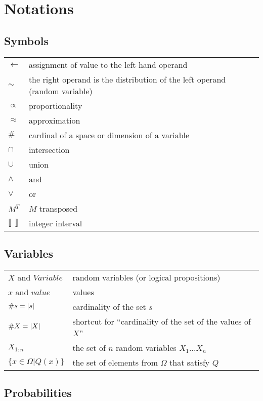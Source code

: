 \section*{Notations}

\subsection*{Symbols}
\begin{tabular}{ll}
$\leftarrow$ & assignment of value to the left hand operand \\
$\sim$ & the right operand is the distribution of the left operand (random variable) \\
$\propto$ & proportionality \\
$\approx$ & approximation \\
$\#$ & cardinal of a space or dimension of a variable \\
$\cap$ & intersection \\
$\cup$ & union \\
$\wedge$ & and \\
$\vee$ & or \\
$M^T$ & $M$ transposed \\
$\llbracket \ \ \rrbracket$ & integer interval \\
\end{tabular}

\subsection*{Variables}
\begin{tabular}{ll}
$X$ and $Variable$ & random variables (or logical propositions) \\
$x$ and $value$ & values \\
$\#s = \left\lvert s\right\rvert$ & cardinality of the set $s$ \\
$\#X = \left\lvert X\right\rvert$ & shortcut for ``cardinality of the set of the values of $X$'' \\
$X_{1:n}$ & the set of $n$ random variables $X_1 \dots X_n$ \\
$\{x \in \Omega | Q(x)\}$ & the set of elements from $\Omega$ that satisfy $Q$ \\
\end{tabular}

\subsection*{Probabilities}

